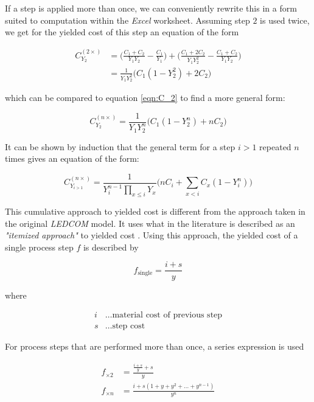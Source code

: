 \documentclass[10pt]{article}
\begin{document}
If a step is applied more than once, we can conveniently rewrite this in a form suited to computation within the \textit{Excel} worksheet. Assuming step $2$ is used twice, we get for the yielded cost of this step an equation of the form

\begin{align}
\label{eqn:C_2^2}
    C_{Y_2}^{(2 \times)} &= \bigg( \frac{C_1 + C_2}{Y_1 Y_2} - \frac{C_1}{Y_1} \bigg) + \bigg( \frac{C_1 + 2 C_2}{Y_1 Y_2^2} - \frac{C_1 + C_2}{Y_1 Y_2}     \bigg) \\
    &= \frac{1}{Y_1 Y_2^2} \bigg( C_1 (1-Y_2^2) +2C_2 \bigg)
\end{align}

which can be compared to equation \cref{eqn:C_2} to find a more general form:

\begin{equation}
    C_{Y_2}^{(n \times)} = \frac{1}{Y_1 Y_2^n} \bigg( C_1 (1-Y_2^n)+nC_2\bigg)
\end{equation}

It can be shown by induction that the general term for a step $i>1$ repeated $n$ times gives an equation of the form:

\begin{equation}
\label{eqn:yielded_cost}
    C_{Y_{i>1}}^{(n \times)} = \frac{1}{Y_i^{n-1} \prod_{x \leq i} Y_x} \bigg( nC_i + \sum_{x < i} C_x (1-Y_i^n) \bigg)
\end{equation}

This cumulative approach to yielded cost is different from the approach taken in the original \textit{LEDCOM} model. It uses what in the literature is described as an \textit{"itemized approach"} to yielded cost \cite{becker2001use}. Using this approach, the yielded cost of a single process step $f$ is described by

\begin{equation}
	f_\text{single} = \frac{i+s}{y}
\end{equation}

where

\begin{align*}
    i &\dots \text{material cost of previous step} \\
    s &\dots \text{step cost}
\end{align*}

For process steps that are performed more than once, a series expression is used

\begin{align}
\label{eqn:series}
    f_{\times 2} &=  \frac{\frac{i+s}{y}+s}{y} \\
    f_{\times n} &= \frac{i + s(1+y+y^2+ \dots + y^{n-1})}{y^n}
\end{align}
\end{document}
